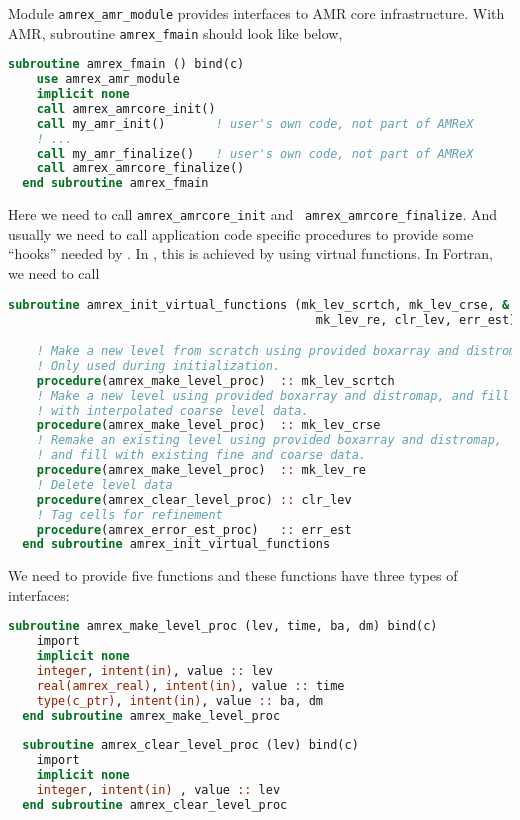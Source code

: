 {Module {\tt amrex\_amr\_module} provides interfaces to AMR core
infrastructure.  With AMR, subroutine {\tt amrex\_fmain} should look
like below,
\begin{lstlisting}[language=fortran]
  subroutine amrex_fmain () bind(c)
    use amrex_amr_module
    implicit none  
    call amrex_amrcore_init()
    call my_amr_init()       ! user's own code, not part of AMReX
    ! ...
    call my_amr_finalize()   ! user's own code, not part of AMReX
    call amrex_amrcore_finalize()
  end subroutine amrex_fmain
\end{lstlisting}
Here we need to call {\tt amrex\_amrcore\_init} and {\tt
  amrex\_amrcore\_finalize}.  And usually we need to call application
code specific procedures to provide some ``hooks'' needed by \amrex.
In \cpp, this is achieved by using virtual functions.  In Fortran, we
need to call
\begin{lstlisting}[language=fortran]
  subroutine amrex_init_virtual_functions (mk_lev_scrtch, mk_lev_crse, &
                                           mk_lev_re, clr_lev, err_est)

    ! Make a new level from scratch using provided boxarray and distromap
    ! Only used during initialization.
    procedure(amrex_make_level_proc)  :: mk_lev_scrtch
    ! Make a new level using provided boxarray and distromap, and fill
    ! with interpolated coarse level data.
    procedure(amrex_make_level_proc)  :: mk_lev_crse
    ! Remake an existing level using provided boxarray and distromap,
    ! and fill with existing fine and coarse data.
    procedure(amrex_make_level_proc)  :: mk_lev_re
    ! Delete level data
    procedure(amrex_clear_level_proc) :: clr_lev
    ! Tag cells for refinement
    procedure(amrex_error_est_proc)   :: err_est
  end subroutine amrex_init_virtual_functions
\end{lstlisting}
We need to provide five functions and these functions have three types
of interfaces:
\begin{lstlisting}[language=fortran]
  subroutine amrex_make_level_proc (lev, time, ba, dm) bind(c)
    import
    implicit none
    integer, intent(in), value :: lev
    real(amrex_real), intent(in), value :: time
    type(c_ptr), intent(in), value :: ba, dm
  end subroutine amrex_make_level_proc
  
  subroutine amrex_clear_level_proc (lev) bind(c)
    import
    implicit none
    integer, intent(in) , value :: lev
  end subroutine amrex_clear_level_proc
  

\end{lstlisting}}
